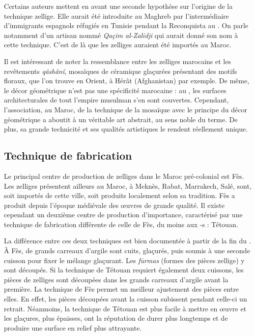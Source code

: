 Certains auteurs \autocite{Castera_1996, Soustiel_1985} mettent en 
avant une seconde hypothèse sur l'origine de la technique zellige. 
Elle aurait été introduite au Maghreb par l'intermédiaire 
d'immigrants espagnols réfugiés en Tunisie pendant la Reconquista 
au . On parle notamment d'un artisan nommé \emph{Qaçim
al-Zalidji} qui aurait donné son nom à cette technique. C'est de là 
que les zelliges auraient été importés au Maroc.

Il est intéressant de noter la ressemblance entre les zelliges 
marocains et les revêtements \emph{qâshânî}, mosaïques de céramique 
glaçurées présentant des motifs floraux, que l'on trouve en Orient, 
à Hérât (Afghanistan) par exemple. De même, le décor géométrique 
n'est pas une spécificité marocaine : au , les surfaces 
architecturales de tout l'empire musulman s'en sont couvertes. 
Cependant, l'association, au Maroc, de la technique de la mosaïque 
avec le principe du décor géométrique a aboutit à un véritable art 
abstrait, au sens noble du terme. De plus, sa grande technicité et 
ses qualités artistiques le rendent réellement unique.

\subsection{Technique de fabrication}
Le principal centre de production de zelliges dans le Maroc 
pré-colonial est Fès. Les zelliges présentent ailleurs au Maroc, 
à Meknès, Rabat, Marrakech, Salé, sont, soit importés de cette ville, 
soit produits localement selon sa tradition. Fès a produit depuis 
l'époque médiévale des {\oe}uvres de grande qualité. Il existe 
cependant un deuxième centre de production d'importance, caractérisé 
par une technique de fabrication différente de celle de Fès, du moins 
aux -s : Tétouan.

La différence entre ces deux techniques est bien documentée à partir 
de la fin du . À Fès, de grands carreaux d'argile sont 
cuits, glaçurés, puis soumis à une seconde cuisson pour fixer le 
mélange glaçurant. Les \emph{f\=urmas} (formes des pièces zellige) 
y sont découpés. Si la technique de Tétouan requiert également deux 
cuissons, les pièces de zelliges sont découpées dans les grands 
carreaux d'argile avant la première. La technique de Fès permet un 
meilleur ajustement des pièces entre elles. En effet, les pièces 
découpées avant la cuisson subissent pendant celle-ci un retrait. 
Néanmoins, la technique de Tétouan est plus facile à mettre en 
{\oe}uvre et les glaçures, plus épaisses, ont la réputation de durer 
plus longtemps et de produire une surface en relief plus attrayante.

